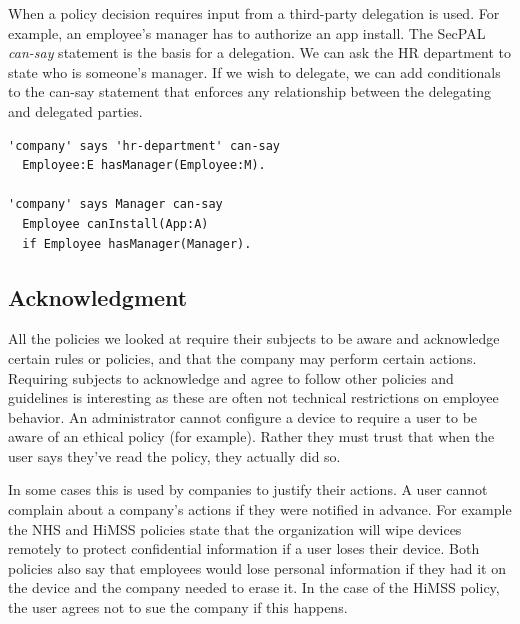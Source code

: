 \documentclass[thesis.tex]{subfiles}
\begin{document}
When a policy decision requires input from a third-party delegation is used.
For example, an employee's manager has to authorize an app install.
The SecPAL \emph{can-say} statement is the basis for a delegation.
We can ask the HR department to state who is someone's manager.
If we wish to delegate, we can add conditionals to the can-say
statement that enforces any relationship between the delegating and
delegated parties.

\begin{lstlisting}
'company' says 'hr-department' can-say
  Employee:E hasManager(Employee:M).

'company' says Manager can-say
  Employee canInstall(App:A)
  if Employee hasManager(Manager).
\end{lstlisting}

\subsection{Acknowledgment}

All the policies we looked at require their subjects to be aware and
acknowledge certain rules or policies, and that the company may
perform certain actions.  Requiring subjects to acknowledge and agree
to follow other policies and guidelines is interesting as these are
often not technical restrictions on employee behavior.  An
administrator cannot configure a device to require a user to be aware
of an ethical policy (for example).  Rather they must trust that when
the user says they've read the policy, they actually did so.

In some cases this is used by companies to justify their actions.  A
user cannot complain about a company's actions if they were notified
in advance.  For example the NHS and \ac{HiMSS} policies state that
the organization will wipe devices remotely to protect confidential
information if a user loses their device.  Both policies also say that
employees would lose personal information if they had it on the device
and the company needed to erase it.  In the case of the \ac{HiMSS} policy, the user agrees not to
sue the company if this happens.
\end{document}
